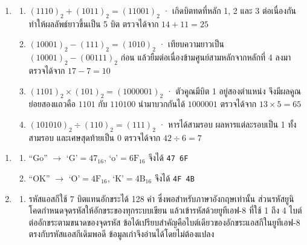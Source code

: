 \begin{enumerate}[resume*=anskey]
    \item
    \begin{enumerate}[label=\textbf{\thechapter.\arabic{enumi}.\arabic*}]
        \item $(1110)_2 + (1011)_2 = (11001)_2$ · เกิดบิตทดที่หลัก 1, 2 และ 3 ต่อเนื่องกัน ทำให้ผลลัพธ์ยาวขึ้นเป็น 5 บิต ตรวจได้จาก $14+11=25$
        \item $(10001)_2 - (111)_2 = (1010)_2$ · เทียบความยาวเป็น $(10001)_2 - (00111)_2$ ก่อน แล้วยืมต่อเนื่องข้ามศูนย์สามหลักจากหลักที่ 4 ลงมา ตรวจได้จาก $17-7=10$
        \item $(1101)_2 \times (101)_2 = (1000001)_2$ · ตัวคูณมีบิต 1 อยู่สองตำแหน่ง จึงมีผลคูณย่อยสองแถวคือ $1101$ กับ $110100$ นำมาบวกกันได้ $1000001$ ตรวจได้จาก $13 \times 5=65$
        \item $(101010)_2 \div (110)_2 = (111)_2$ · หารได้สามรอบ ผลหารแต่ละรอบเป็น 1 ทั้งสามรอบ และเศษสุดท้ายเป็น 0 ตรวจได้จาก $42 \div 6 = 7$
    \end{enumerate}
\end{enumerate}

\begin{enumerate}[resume*=anskey]
    \item
    \begin{enumerate}[label=\textbf{\thechapter.\arabic{enumi}.\arabic*}]
        \item ``Go'' $\to$ `G'$=47_{16}$, `o'$=6\mathrm{F}_{16}$ จึงได้ \texttt{47 6F}
        \item ``OK'' $\to$ `O'$=4\mathrm{F}_{16}$, `K'$=4\mathrm{B}_{16}$ จึงได้ \texttt{4F 4B}
    \end{enumerate}

    \item
    \begin{enumerate}[label=\textbf{\thechapter.\arabic{enumi}.\arabic*}]
        \item รหัสแอสกีใช้ 7 บิตแทนอักขระได้ 128 ค่า ซึ่งพอสำหรับภาษาอังกฤษเท่านั้น ส่วนรหัสยูนิโคดกำหนดจุดรหัสให้อักขระของทุกระบบเขียน แล้วเข้ารหัสด้วยยูทีเอฟ-8 ที่ใช้ 1 ถึง 4 ไบต์ต่ออักขระตามขนาดของจุดรหัส ข้อได้เปรียบสำคัญคือไบต์เดียวของอักขระแอสกีในยูทีเอฟ-8 ตรงกับรหัสแอสกีเดิมพอดี ข้อมูลเก่าจึงอ่านได้โดยไม่ต้องแปลง
    \end{enumerate}
\end{enumerate}

